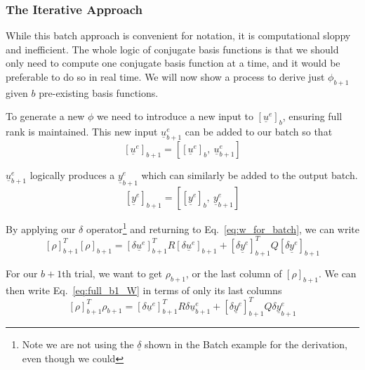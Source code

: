 \FloatBarrier\subsubsection{The Iterative Approach}
While this batch approach is convenient for notation, it is computational sloppy and inefficient. The whole logic of conjugate basis functions is that we should only need to compute one conjugate basis function at a time, and it would be preferable to do so in real time. We will now show a process to derive just $\phi_{b+1}$ given $b$ pre-existing basis functions.

To generate a new $\phi$ we need to introduce a new input to ${\left[\underline{u}^e\right]}_b$, ensuring full rank is maintained. This new input $\underline{u}_{b+1}^e$ can be added to our batch so that
\begin{equation}
    {\left[\underline{u}^e\right]}_{b+1} = \left[{\left[\underline{u}^e\right]}_b,\ \underline{u}_{b+1}^e\right]
\end{equation}

$\underline{u}_{b+1}^e$ logically produces a $\underline{y}_{b+1}^e$ which can similarly be added to the output batch.
\begin{equation}
    {\left[\underline{y}^e\right]}_{b+1} = \left[{\left[\underline{y}^e\right]}_b,\ \underline{y}_{b+1}^e\right]
\end{equation}

By applying our $\delta$ operator\footnote{Note we are not using the $\underline{\delta}$ shown in the Batch example for the derivation, even though we could} and returning to Eq.~\ref{eq:w_for_batch}, we can write
\begin{equation}
    {{\left[\rho\right]}_{b+1}^T} {{\left[\rho\right]}_{b+1}} = {{\left[\delta\underline{u}^e\right]}_{b+1}^T} R {\left[\delta\underline{u}^e\right]}_{b+1} + {{\left[\delta\underline{y}^e\right]}_{b+1}^T} Q {\left[\delta\underline{y}^e\right]}_{b+1}
    \label{eq:full_b1_W}
\end{equation}

For our $b+1$th trial, we want to get $\rho_{b+1}$, or the last column of ${{\left[\rho\right]}_{b+1}}$. We can then write Eq.~\ref{eq:full_b1_W} in terms of only its last columns
\begin{equation}
    {{\left[\rho\right]}_{b+1}^T} \rho_{b+1} = {{\left[\delta\underline{u}^e\right]}_{b+1}^T} R \delta\underline{u}^e_{b+1} + {{\left[\delta\underline{y}^e\right]}_{b+1}^T} Q \delta\underline{y}^e_{b+1}
    \label{eq:b1_W}
\end{equation}

